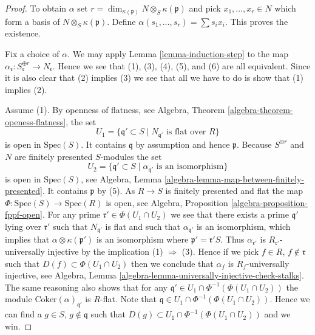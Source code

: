 \begin{proof}
To obtain $\alpha$ set
$r = \dim_{\kappa(\mathfrak p)} N \otimes_S \kappa(\mathfrak p)$ and pick
$x_1, \ldots, x_r \in N$ which form a basis of
$N \otimes_S \kappa(\mathfrak p)$. Define
$\alpha(s_1, \ldots, s_r) = \sum s_i x_i$. This proves the existence.

\medskip\noindent
Fix a choice of $\alpha$.
We may apply
Lemma \ref{lemma-induction-step}
to the map
$\alpha_{\mathfrak r} : S_{\mathfrak r}^{\oplus r} \to N_{\mathfrak r}$.
Hence we see that (1), (3), (4), (5), and (6) are all equivalent.
Since it is also clear that (2) implies (3) we see that all we have to
do is show that (1) implies (2).

\medskip\noindent
Assume (1). By openness of flatness, see
Algebra, Theorem \ref{algebra-theorem-openess-flatness},
the set
$$
U_1 = \{\mathfrak q' \subset S \mid N_{\mathfrak q'}\text{ is flat over }R\}
$$
is open in $\text{Spec}(S)$. It contains $\mathfrak q$ by assumption
and hence $\mathfrak p$. Because $S^{\oplus r}$ and $N$ are finitely presented
$S$-modules the set
$$
U_2 = \{\mathfrak q' \subset S \mid
\alpha_{\mathfrak q'}\text{ is an isomorphism}\}
$$
is open in $\text{Spec}(S)$, see
Algebra, Lemma \ref{algebra-lemma-map-between-finitely-presented}.
It contains $\mathfrak p$ by (5). As $R \to S$
is finitely presented and flat the map
$\Phi : \text{Spec}(S) \to \text{Spec}(R)$ is open, see
Algebra, Proposition \ref{algebra-proposition-fppf-open}.
For any prime $\mathfrak r' \in \Phi(U_1 \cap U_2)$ we see that
there exists a prime $\mathfrak q'$ lying over $\mathfrak r'$ such that
$N_{\mathfrak q'}$ is flat and such that $\alpha_{\mathfrak q'}$ is
an isomorphism, which implies that $\alpha \otimes \kappa(\mathfrak p')$
is an isomorphism where $\mathfrak p' = \mathfrak r' S$. Thus
$\alpha_{\mathfrak r'}$ is $R_{\mathfrak r'}$-universally injective
by the implication (1) $\Rightarrow$ (3).
Hence if we pick $f \in R$, $f \not \in \mathfrak r$ such that
$D(f) \subset \Phi(U_1 \cap U_2)$ then we conclude that
$\alpha_f$ is $R_f$-universally injective, see
Algebra, Lemma \ref{algebra-lemma-universally-injective-check-stalks}.
The same reasoning also shows that for any
$\mathfrak q' \in U_1 \cap \Phi^{-1}(\Phi(U_1 \cap U_2))$
the module $\text{Coker}(\alpha)_{\mathfrak q'}$ is $R$-flat.
Note that $\mathfrak q \in U_1 \cap \Phi^{-1}(\Phi(U_1 \cap U_2))$.
Hence we can find a $g \in S$, $g \not \in \mathfrak q$ such
that $D(g) \subset U_1 \cap \Phi^{-1}(\Phi(U_1 \cap U_2))$
and we win.
\end{proof}

